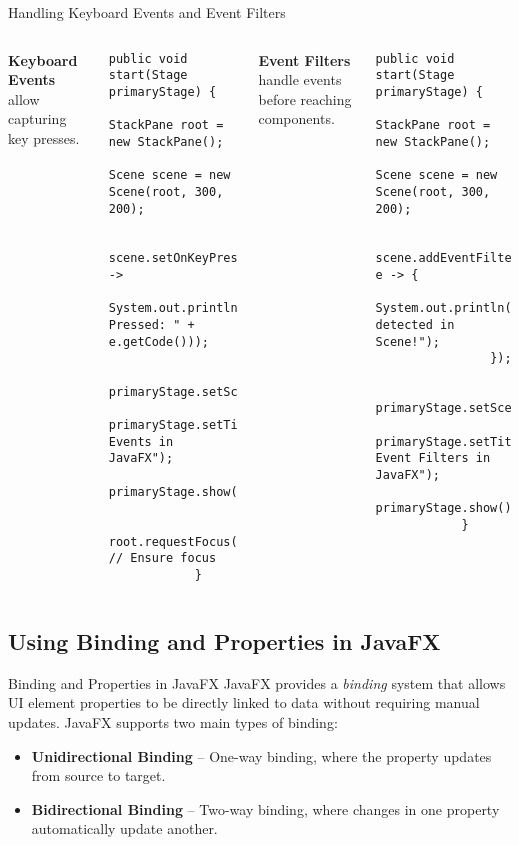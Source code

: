 \documentclass[aspectratio=169, table]{beamer}
\begin{document}
\begin{frame}[fragile]{\LARGE{Handling Keyboard Events and Event Filters}}
	\vspace{10pt}
	\begin{columns}[t]
		\textbf{Keyboard Events} allow capturing key presses.
		\begin{lstlisting}[style=JavaStyle]
			public void start(Stage primaryStage) {
				StackPane root = new StackPane();
				Scene scene = new Scene(root, 300, 200);
				
				scene.setOnKeyPressed(e -> 
				System.out.println("Key Pressed: " + e.getCode()));
				
				primaryStage.setScene(scene);
				primaryStage.setTitle("Keyboard Events in JavaFX");
				primaryStage.show();
				
				root.requestFocus(); // Ensure focus
			}
		\end{lstlisting}
		
		\textbf{Event Filters} handle events before reaching components.
		\begin{lstlisting}[style=JavaStyle]
			public void start(Stage primaryStage) {
				StackPane root = new StackPane();
				Scene scene = new Scene(root, 300, 200);
				
				scene.addEventFilter(MouseEvent.MOUSE_CLICKED, e -> {
					System.out.println("Click detected in Scene!");
				});
				
				primaryStage.setScene(scene);
				primaryStage.setTitle("Using Event Filters in JavaFX");
				primaryStage.show();
			}
		\end{lstlisting}
	\end{columns}
\end{frame}


\subsection{Using Binding and Properties in JavaFX}

\begin{frame}[fragile]{Binding and Properties in JavaFX}
	\vspace{20pt}
	JavaFX provides a \textit{binding} system that allows UI element properties to be directly linked to data without requiring manual updates. JavaFX supports two main types of binding:
	\begin{itemize}
		\item \textbf{Unidirectional Binding} – One-way binding, where the property updates from source to target.
		\item \textbf{Bidirectional Binding} – Two-way binding, where changes in one property automatically update another.
	\end{itemize}
\end{frame}
\end{document}
